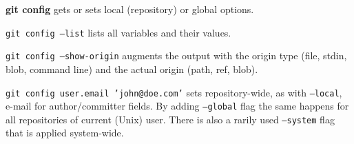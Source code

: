 %

\textbf{git config} gets or sets local (repository) or global options.

\texttt{git config --list} lists all variables and their values.

\texttt{git config --show-origin} augments the output with the origin type (file, stdin, blob, command line) and the actual origin (path, ref, blob).

\texttt{git config user.email 'john@doe.com'} sets repository-wide, as with \texttt{--local}, e-mail for author/committer fields.
By adding \texttt{--global} flag the same happens for all repositories of current (Unix) user.
There is also a rarily used \texttt{--system} flag that is applied system-wide.

%